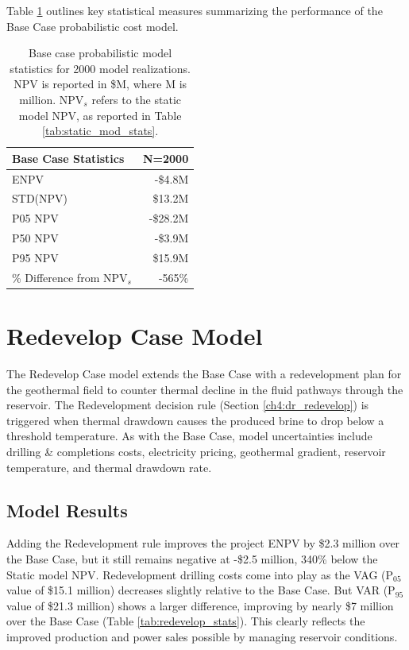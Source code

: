 Table \ref{tab:base_stats} outlines key statistical measures summarizing the performance of the Base Case probabilistic cost model.

\begin{table}[H]
\centering
\begin{tabular}{|l|r|}
\hline
\textbf{Base Case Statistics} & N=2000 \\ \hline
ENPV & -\$4.8M \\ \hline
STD(NPV) & \$13.2M \\ \hline
P05 NPV & -\$28.2M \\ \hline
P50 NPV & -\$3.9M \\ \hline
P95 NPV & \$15.9M \\ \hline
\% Difference from NPV$_{s}$ & -565\% \\ \hline
\end{tabular}
\caption[Probabilistic Base Case statistics]{Base case probabilistic model statistics for 2000 model realizations. NPV is reported in \$M, where M is million. NPV$_s$ refers to the static model NPV, as reported in Table \ref{tab:static_mod_stats}.}
\label{tab:base_stats}
\end{table}

\section{Redevelop Case Model}
\label{ch6:redevelop_case}

The Redevelop Case model extends the Base Case with a redevelopment plan for the geothermal field to counter thermal decline in the fluid pathways through the reservoir. The Redevelopment decision rule (Section \ref{ch4:dr_redevelop}) is triggered when thermal drawdown causes the produced brine to drop below a threshold temperature. As with the Base Case, model uncertainties include drilling \& completions costs, electricity pricing, geothermal gradient, reservoir temperature, and thermal drawdown rate.

\subsection{Model Results}
\label{ch6:redevelop_results}

Adding the Redevelopment rule improves the project ENPV by \$2.3 million over the Base Case, but it still remains negative at -\$2.5 million, 340\% below the Static model NPV. Redevelopment drilling costs come into play as the VAG (P$_{05}$ value of \$15.1 million) decreases slightly relative to the Base Case. But VAR (P$_{95}$ value of \$21.3 million) shows a larger difference, improving by nearly \$7 million over the Base Case (Table \ref{tab:redevelop_stats}). This clearly reflects the improved production and power sales possible by managing reservoir conditions.

